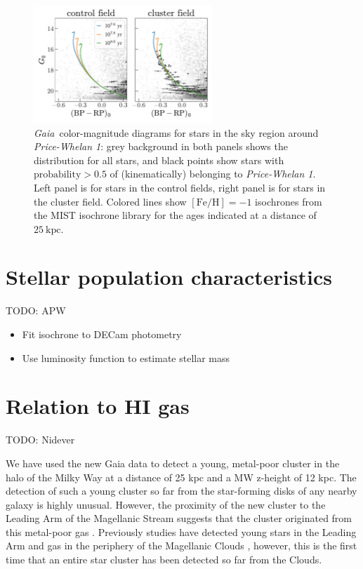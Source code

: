 \documentclass[modern]{aastex62}
\newcommand{\gaia}{\textsl{Gaia}}
\newcommand{\todo}[1]{{\color{red} TODO: #1}}
\newcommand{\kpc}{\textrm{kpc}}
\newcommand{\feh}{\ensuremath{[\textrm{Fe} / \textrm{H}]}}
\newcommand{\clustername}{\textsl{Price-Whelan 1}}
\newcommand{\isodist}{\ensuremath{25~\kpc}}
\begin{document}
\begin{figure}
\centering
\includegraphics[width=0.6\textwidth]{figures/pm-members-cmd.pdf}
\caption{\gaia\ color-magnitude diagrams for stars in the sky region around \clustername: grey background in both panels shows the distribution for all stars, and black points show stars with $\textrm{probability} > 0.5$ of (kinematically) belonging to \clustername.
Left panel is for stars in the control fields, right panel is for stars in the cluster field.
Colored lines show $\feh = -1$ isochrones from the MIST \citep{TODO} isochrone library for the ages indicated at a distance of \isodist.
}
\label{fig:pm-members-cmd}
\end{figure}


\section{Stellar population characteristics}
\label{sec:popchars}

\todo{APW}

\begin{itemize}
\item Fit isochrone to DECam photometry
\item Use luminosity function to estimate stellar mass
\end{itemize}

\section{Relation to HI gas}
\label{sec:higas}

\todo{Nidever}

We have used the new Gaia data to detect a young, metal-poor cluster in the halo of the Milky Way at a distance of 25 kpc and a MW z-height of 12 kpc.  The detection of such a young cluster so far from the star-forming disks of any nearby
galaxy is highly unusual.  However, the proximity of the new cluster to the Leading Arm of the Magellanic Stream suggests
that the cluster originated from this metal-poor gas \citep{Fox:2018}.  Previously studies have detected young stars in the Leading Arm and gas in the periphery of the Magellanic Clouds \citep{Casetti-Dinescu:2014, MoniBidin:2017}, however, this is the first time that an entire star cluster has been detected so far from the Clouds.
\end{document}
